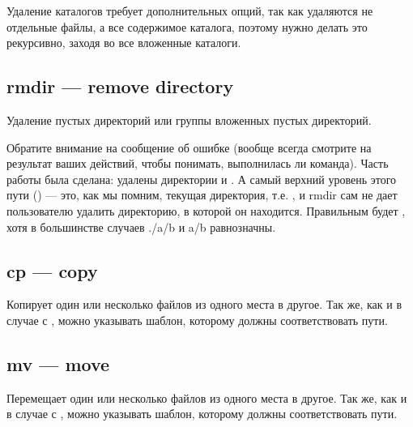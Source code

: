 \documentclass[letterpaper,10pt,russian]{sphinxmanual}
\begin{document}
\sphinxAtStartPar
{}

\sphinxAtStartPar
Удаление каталогов требует дополнительных опций, так как удаляются не отдельные файлы, а все содержимое каталога, поэтому нужно делать это рекурсивно, заходя во все вложенные каталоги.

\sphinxAtStartPar
{}


\subsection{rmdir — remove directory}
\label{\detokenize{educational_materials/bash/content:rmdir-remove-directory}}
\sphinxAtStartPar
Удаление пустых директорий или группы вложенных пустых директорий.

\sphinxAtStartPar
{}

\sphinxAtStartPar
Обратите внимание на сообщение об ошибке (вообще всегда смотрите на результат ваших действий, чтобы понимать, выполнилась ли команда). Часть работы была сделана: удалены директории  и . А самый верхний уровень этого пути () — это, как мы помним, текущая директория, т.е. , и rmdir сам не дает пользователю удалить директорию, в которой он находится. Правильным будет , хотя в большинстве случаев ./a/b и a/b равнозначны.

\sphinxAtStartPar
{}


\subsection{cp — copy}
\label{\detokenize{educational_materials/bash/content:cp-copy}}
\sphinxAtStartPar
Копирует один или несколько файлов из одного места в другое. Так же, как и в случае с , можно указывать шаблон, которому должны соответствовать пути.

\sphinxAtStartPar
{}


\subsection{mv — move}
\label{\detokenize{educational_materials/bash/content:mv-move}}
\sphinxAtStartPar
Перемещает один или несколько файлов из одного места в другое. Так же, как и в случае с , можно указывать шаблон, которому должны соответствовать пути.
\end{document}

